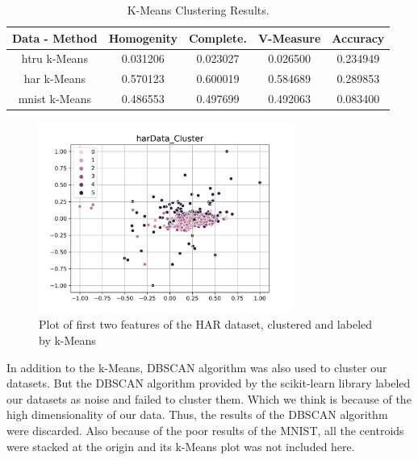 \documentclass[journal]{IEEEtran}
\begin{document}
\begin{table}[!ht]
\renewcommand{\arraystretch}{1.3}
\caption{K-Means Clustering Results.}
\label{tab_kmeans_res}
\centering
\begin{tabular}{|c|c|c|c|c|}
\hline
Data - Method &  Homogenity &  Complete. &  V-Measure &  Accuracy \\
\hline
\hline
htru k-Means &    0.031206 &      0.023027 &   0.026500 &  0.234949 \\
\hline
har k-Means&    0.570123 &      0.600019 &   0.584689 &  0.289853 \\
\hline 
mnist k-Means&    0.486553 &      0.497699 &   0.492063 &  0.083400 \\
\hline
\end{tabular}
\end{table}


\begin{figure}[!ht]
  \centering
  \includegraphics[width=3.3in]{images/harData_Cluster.png}
  \caption{Plot of first two features of the HAR dataset, clustered and labeled by k-Means}
  \label{fig_harData_Cluster}
\end{figure}
\par

In addition to the k-Means, DBSCAN algorithm was also used to cluster our datasets. But the DBSCAN algorithm provided by the scikit-learn library labeled our datasets as noise and failed to cluster them. Which we think is because of the high dimensionality of our data. Thus, the results of the DBSCAN algorithm were discarded. Also because of the poor results of the MNIST, all the centroids were stacked at the origin and its k-Means plot was not included here.
\end{document}
